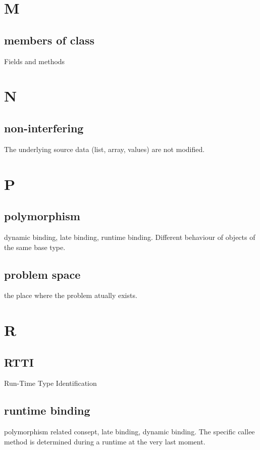 \documentclass{report}
\begin{document}
\section{M}

\subsection{members of class}
Fields and methods


\section{N}

\subsection{non-interfering}
The underlying source data (list, array, values) are not modified.


\section{P}

\subsection{polymorphism}
dynamic binding, late binding, runtime binding. Different behaviour of objects of the same base type.

\subsection{problem space}
the place where the problem atually exists.


\section{R}

\subsection{RTTI}
Run-Time Type Identification

\subsection{runtime binding}
polymorphism related consept, late binding, dynamic binding. The specific callee method is determined during a runtime at the very last moment.
\end{document}
